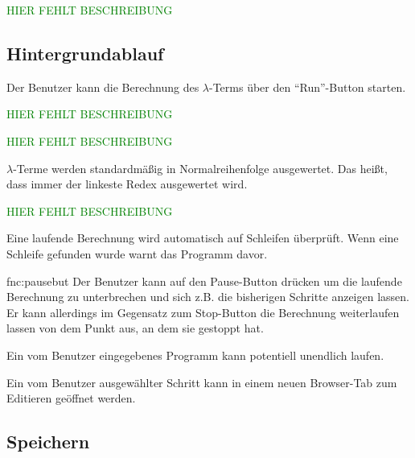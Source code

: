 \documentclass[parskip=full,11pt,twoside]{scrartcl}
\begin{document}
\textcolor{green}{HIER FEHLT BESCHREIBUNG}

\subsection{Hintergrundablauf}
Der Benutzer kann die Berechnung des $\lambda$-Terms über den \enquote{Run}-Button starten.

\textcolor{green}{HIER FEHLT BESCHREIBUNG}

\textcolor{green}{HIER FEHLT BESCHREIBUNG}

$\lambda$-Terme werden standardmäßig in Normalreihenfolge ausgewertet.
Das heißt, dass immer der linkeste Redex ausgewertet wird.

\textcolor{green}{HIER FEHLT BESCHREIBUNG}

Eine laufende Berechnung wird automatisch auf Schleifen überprüft. Wenn eine Schleife gefunden wurde warnt das Programm davor.


 {fnc:pausebut} 
Der Benutzer kann auf den Pause-Button drücken um die laufende Berechnung zu unterbrechen und sich z.B. die bisherigen Schritte anzeigen lassen. Er kann allerdings im Gegensatz zum Stop-Button die Berechnung weiterlaufen lassen von dem Punkt aus, an dem sie gestoppt hat.

Ein vom Benutzer eingegebenes Programm kann potentiell unendlich laufen.

Ein vom Benutzer ausgewählter Schritt kann in einem neuen Browser-Tab zum Editieren geöffnet werden.

\subsection{Speichern}
\end{document}
